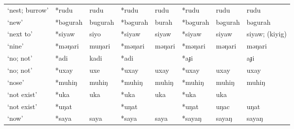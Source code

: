 \begin{landscape}
\begin{longtable}[c]{@{}p{3cm}<{\raggedright}p{2.75cm}<{\raggedright}p{2.75cm}<{\raggedright}p{2.75cm}<{\raggedright}p{2.75cm}<{\raggedright}p{2.75cm}<{\raggedright}p{2.75cm}<{\raggedright}p{2.75cm}<{\raggedright}@{}}
`nest; burrow'                                       & *rudu              & rudu                           & *rudu              & rudu                       & *rudu            & rudu                     & rudu                              \\
`new'                                                & *bəgurah           & bugurah                        & *bəgurah           & burah                      & *bəgurah         & bəgurah                  & bəgurah                           \\
`next to'                                            & *siyaw             & siyo                           & *siyaw             & siyaw                      & *siyaw           & siyaw                    & siyaw; (kiyig)                    \\
`nine'                                               & *məŋari            & muŋari                         & *məŋari            & məŋari                     & *məŋari          & məŋari                   & məŋari                            \\
`no; not'                                            & *adi               & kadi                           & *adi               &                            & *aɟi             &                          & aɟi                               \\
`no; not'                                            & *uxay              & uxe                            & *uxay              & uxay                       & *uxay            & uxay                     & uxay                              \\
`nose'                                               & *muhiŋ             & muhiŋ                          & *muhiŋ             & muhiŋ                      & *muhiŋ           & muhiŋ                    & muhiŋ                             \\
`not exist'                                          & *uka               & uka                            & *uka               & uka                        & *uka             & uka                      &                                   \\
`not exist'                                          & *uŋat              &                                & *uŋat              &                            & *uŋat            & uŋac                     & uŋat                              \\
`now'                                                & *saya              & saya                           & *saya              & saya                       & *sayaŋ           & sayaŋ                    & sayaŋ                             \\

\end{longtable}
\end{landscape}
